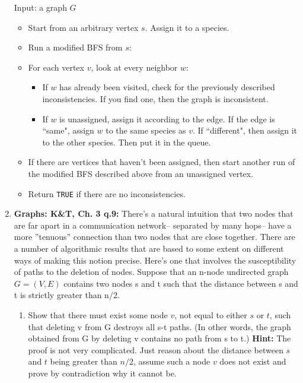 \documentclass[letterpaper, 11pt]{article}
\begin{document}
\begin{enumerate}
    Input: a graph $G$
    \begin{itemize}
        \item Start from an arbitrary vertex $s$. Assign it to a species.
        \item Run a modified BFS from $s$:
        \item For each vertex $v$, look at every neighbor $w$:
        \begin{itemize}
            \item If $w$ has already been visited, check for the previously described inconsistencies. If you find one, then the graph is inconsistent.
            \item If $w$ is unassigned, assign it according to the edge. If the edge is ``same", assign $w$ to the same species as $v$. If ``different", then assign it to the other species. Then put it in the queue.
        \end{itemize}
        \item If there are vertices that haven't been assigned, then start another run of the modified BFS described above from an unassigned vertex.
        \item Return \texttt{TRUE} if there are no inconsistencies.
    \end{itemize}

    \item \textbf{Graphs: K\&T, Ch. 3 q.9:} There’s a natural intuition that two nodes that are far apart in a communication network– separated by many hops– have a more ”tenuous” connection than two nodes that are close together. There are a number of algorithmic results that are based to some extent on different ways of making this notion precise. Here’s one that involves the susceptibility of paths to the deletion of nodes. Suppose that an n-node undirected graph $G = (V,E)$ contains two nodes s and t such that the distance between s and t is strictly greater than n/2.

    \begin{enumerate}
        \item Show that there must exist some node $v$, not equal to either $s$ or $t$, such that deleting v from G destroys all s-t paths. (In other words, the graph obtained from G by deleting v contains no path from s to t.) \textbf{Hint:} The proof is not very complicated. Just reason about the distance between $s$ and $t$ being greater than $n/2$, assume such a node $v$ does not exist and prove by contradiction why it cannot be.


\end{enumerate}
\end{enumerate}
\end{document}
